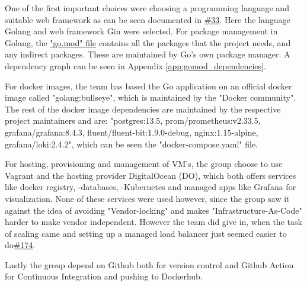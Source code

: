 
One of the first important choices were choosing a programming language and suitable web framework as can be seen documented in \href{https://github.com/DevelOpsITU/MiniTwit/issues/33}{\#33}. Here the language Golang and web framework Gin were selected. For package management in Golang, the \href{https://github.com/DevelOpsITU/MiniTwit/blob/main/go.mod}{"go.mod" file} contains all the packages that the project needs, and any indirect packages. These are maintained by Go's own package manager. A dependency graph can be seen in Appendix \ref{app:gomod_dependencies}.

For docker images, the team has based the Go application on an official docker image called "golang:bullseye", which is maintained by the "Docker community"\cite{docker_go_image}. The rest of the docker image dependencies are maintained by the respective project maintainers and are: "postgres:13.5, prom/prometheus:v2.33.5, grafana/grafana:8.4.3, fluent/fluent-bit:1.9.0-debug, nginx:1.15-alpine, grafana/loki:2.4.2", which can be seen the "docker-compose.yaml"\cite{github_minitwit_dockercompose} file.

For hosting, provisioning and management of VM's, the group choose to use Vagrant and the hosting provider DigitalOcean (DO), which both offers services like docker registry, -databases, -Kubernetes and managed apps like Grafana for visualization. None of these services were used however, since the group saw it against the idea of avoiding "Vendor-locking" and makes "Infrastructure-As-Code" harder to make vendor independent. However the team did give in, when the task of scaling came and setting up a managed load balancer just seemed easier to do\href{https://github.com/DevelOpsITU/MiniTwit/issues/174}{\#174}. 

Lastly the group depend on Github both for version control and Github Action for Continuous Integration and pushing to Dockerhub. 



